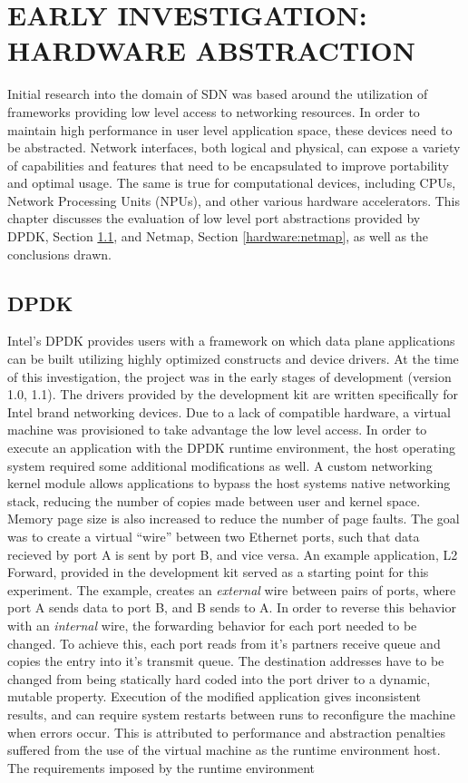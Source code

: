 \chapter{EARLY INVESTIGATION: HARDWARE ABSTRACTION}
\label{hardware}
Initial research into the domain of SDN was based around the utilization
of frameworks providing low level access to networking resources. In order
to maintain high performance in user level application space, these devices
need to be abstracted. Network interfaces, both logical and physical, can
expose a variety of capabilities and features that need to be encapsulated
to improve portability and optimal usage. The same is true for computational
devices, including CPUs, Network Processing Units (NPUs), and other various
hardware accelerators. This chapter discusses the evaluation of low level
port abstractions provided by DPDK, Section \ref{hardware:dpdk}, and Netmap,
Section \ref{hardware:netmap}, as well as the conclusions drawn.

\section{DPDK}
\label{hardware:dpdk}
Intel's DPDK provides users with a framework on which data plane applications
can be built utilizing highly optimized constructs and device drivers. At the
time of this investigation, the project was in the early stages of development
(version 1.0, 1.1). The drivers provided by the development kit are written
specifically for Intel brand networking devices. Due to a lack of compatible
hardware, a virtual machine was provisioned to take advantage the low level
access. In order to execute an application with the DPDK runtime environment,
the host operating system required some additional modifications as well. A
custom networking kernel module allows applications to bypass the host systems
native networking stack, reducing the number of copies made between user and
kernel space. Memory page size is also increased to reduce the number of page
faults. The goal was to create a virtual ``wire'' between two Ethernet ports,
such that data recieved by port A is sent by port B, and vice versa. An example
application, L2 Forward, provided in the development kit served as a starting
point for this experiment. The example, creates an \emph{external} wire between
pairs of ports, where port A sends data to port B, and B sends to A. In order to
reverse this behavior with an \emph{internal} wire, the forwarding behavior for
each port needed to be changed. To achieve this, each port reads from it's
partners receive queue and copies the entry into it's transmit queue. The
destination addresses have to be changed from being statically hard coded into
the port driver to a dynamic, mutable property. Execution of the modified
application gives inconsistent results, and can require system restarts between
runs to reconfigure the machine when errors occur. This is attributed to
performance and abstraction penalties suffered from the use of the virtual
machine as the runtime environment host. The requirements imposed by the runtime
environment



